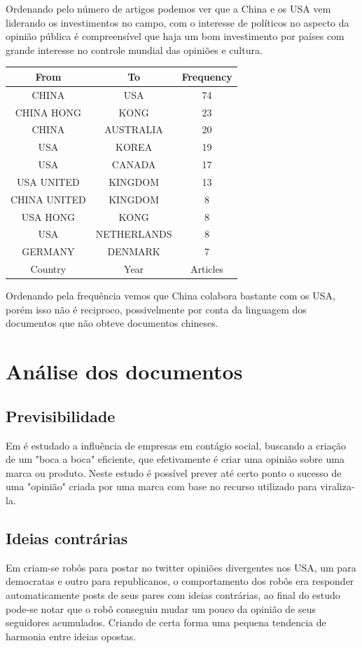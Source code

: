 Ordenando pelo número de artigos podemos ver que a China e os USA vem liderando os investimentos no campo, com o interesse de políticos no aspecto da opinião pública é compreensível que haja um bom investimento por países com grande interesse no controle mundial das opiniões e cultura.


\begin{center}
\begin{tabular}{||c c c ||} 
\hline
From &	To &	Frequency\\ [0.5ex] 
 \hline\hline
CHINA	& USA	& 74\\ \hline
CHINA	HONG & KONG	& 23\\ \hline
CHINA	& AUSTRALIA	& 20\\ \hline
USA	& KOREA	& 19\\ \hline
USA	& CANADA	& 17\\ \hline
USA	UNITED & KINGDOM	& 13\\ \hline
CHINA	UNITED & KINGDOM	& 8\\ \hline
USA	HONG & KONG	& 8\\ \hline
USA	& NETHERLANDS	& 8\\ \hline
GERMANY	& DENMARK	& 7\\ \hline\hline
 Country & Year & Articles\\ \hline
\end{tabular}
\end{center}

Ordenando pela frequência vemos que China colabora bastante com os USA, porém isso não é reciproco, possivelmente por conta da linguagem dos documentos que não obteve documentos chineses.

\section{Análise dos documentos}
\subsection{Previsibilidade}
Em \cite{aral_creating_2011} é estudado a influência de empresas em contágio social, buscando a criação de um "boca a boca" eficiente, que efetivamente é criar uma opinião sobre uma marca ou produto. Neste estudo é possível prever até certo ponto o sucesso de uma "opinião" criada por uma marca com base no recurso utilizado para viraliza-la.

\subsection{Ideias contrárias}
Em \cite{bail_exposure_2018} criam-se robôs para postar no twitter opiniões divergentes nos USA, um para democratas e outro para republicanos, o comportamento dos robôs era responder automaticamente posts de seus pares com ideias  contrárias, ao final do estudo pode-se notar que o robô conseguiu mudar um pouco da opinião de seus seguidores acumulados. Criando de certa forma uma pequena tendencia de harmonia entre ideias opostas.

